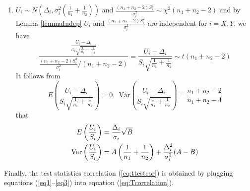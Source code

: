 \begin{enumerate}
		\item $U_i\sim N\left(\Delta_i, \sigma_i^2(\frac{1}{n_1} + \frac{1}{n_2})\right)$ and 
		$\frac{(n_1 + n_2 -2)S_i^2}{\sigma_i^2} \sim
		\chi^2(n_1 + n_2-2)$ and by Lemma \ref{lemmaIndep}  $U_i$ and $\frac{(n_1 + n_2 
		-2)S_i^2}{\sigma_i^2}$ are independent for $i = X, Y$, we have 
		\begin{equation}
		\frac{\frac{U_i-\Delta_i}{\sigma_i\sqrt{\frac{1}{n_1} + \frac{1}{n_2}}}}{\frac{(n_1 + 
		n_2-2)S_i^2}{\sigma_i^2}/(n_1 + n_2 -2)}  =
		\frac{U_i-\Delta_i}{S_i\sqrt{\frac{1}{n_1 } + \frac{1}{n_2}}}\sim t(n_1 + n_2-2)
		\end{equation}	
		It follows from 
		\begin{equation}
		E\left(\frac{U_i-\Delta_i}{S_i\sqrt{\frac{1}{n_1} + \frac{1}{n_2}}}\right)=0, ~~ 
		\text{Var}\left(\frac{U_i-\Delta_i}{S_i\sqrt{\frac{1}{n_1} + \frac{1}{n_2}}}\right) = 
		\frac{n_1 + n_2-2}{n_1 + n_2-4}
		\end{equation}
		that
		\begin{equation}\label{eq3}
		\begin{aligned}
		E\left(\frac{U_i}{S_i}\right) &= \frac{\Delta_i}{\sigma_i}\sqrt{B} \\
		\text{Var}\left(\frac{U_i}{S_i}\right)&=A\left(\frac{1}{n_1} + \frac{1}{n_2}\right) + 
		\frac{\Delta_i^2}{\sigma_i^2}(A-B)
		\end{aligned}
		\end{equation}
	\end{enumerate}
	Finally,  the test statistics correlation (\ref{eq:ttestcor}) is obtained by plugging
	equations (\ref{eq1}--\ref{eq3}) into equation (\ref{eq:Tcorrelation}).
	
